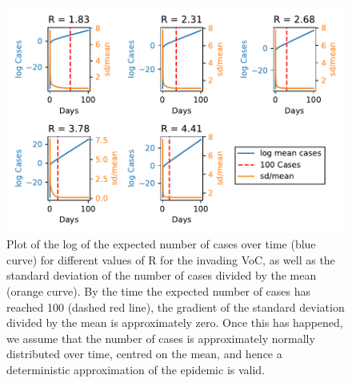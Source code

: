 \documentclass{article}
\begin{document}
\begin{figure}
\centering

\includegraphics[width = \textwidth]{sig_over_mean_comparison.pdf}
\caption{Plot of the log of the expected number of cases over time (blue curve) for different values of R for the invading VoC, as well as the standard deviation of the number of cases divided by the mean (orange curve). By the time the expected number of cases has reached 100 (dashed red line), the gradient of the standard deviation divided by the mean is approximately zero. Once this has happened, we assume that the number of cases is approximately normally distributed over time, centred on the mean, and hence a deterministic approximation of the epidemic is valid. } 
\label{fig: sig_over_mean}
\end{figure}



\end{document}
